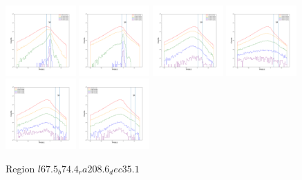 \documentclass[12pt,prd]{article}
\begin{document}
\begin{figure}[h!]
\includegraphics[width=0.24\textwidth]{../figures/scanning_plotsgaiascan_l67_5_b74_4_ra208_6_dec35_1_npy_12.pdf}
\includegraphics[width=0.24\textwidth]{../figures/scanning_plotsgaiascan_l67_5_b74_4_ra208_6_dec35_1_npy_13.pdf}
\includegraphics[width=0.24\textwidth]{../figures/scanning_plotsgaiascan_l67_5_b74_4_ra208_6_dec35_1_npy_14.pdf}
\includegraphics[width=0.24\textwidth]{../figures/scanning_plotsgaiascan_l67_5_b74_4_ra208_6_dec35_1_npy_15.pdf}
\includegraphics[width=0.24\textwidth]{../figures/scanning_plotsgaiascan_l67_5_b74_4_ra208_6_dec35_1_npy_16.pdf}
\includegraphics[width=0.24\textwidth]{../figures/scanning_plotsgaiascan_l67_5_b74_4_ra208_6_dec35_1_npy_17.pdf}
\caption{Region $l67.5_b74.4_ra208.6_dec35.1$}
\end{figure}
\end{document}
